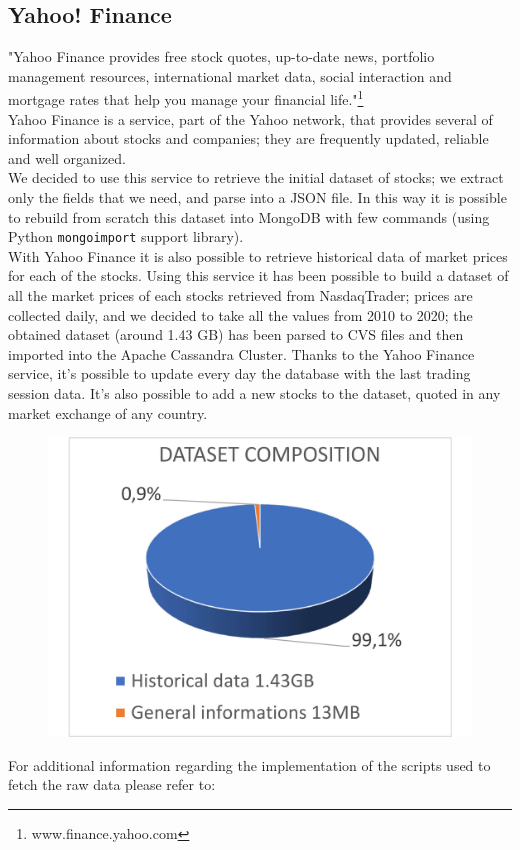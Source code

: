 \subsection{Yahoo! Finance}
"Yahoo Finance provides free stock quotes, up-to-date news, portfolio management
resources, international market data, social interaction and mortgage rates that
help you manage your financial life."\footnote{www.finance.yahoo.com}\\
Yahoo Finance is a service, part of the Yahoo network, that provides several of
information about stocks and companies; they are frequently updated, reliable
and well organized.\\
We decided to use this service to retrieve the initial dataset of stocks; we
extract only the fields that we need, and parse into a JSON file. In this way it
is possible to rebuild from scratch this dataset into MongoDB with few commands
(using Python \texttt{mongoimport} support library).\\
With Yahoo Finance it is also possible to retrieve historical data of market
prices for each of the stocks. Using this service it has been possible to build
a dataset of all the market prices of each stocks retrieved from NasdaqTrader;
prices are collected daily, and we decided to take all the values from 2010 to
2020; the obtained dataset (around 1.43 GB) has been parsed to CVS files and then
imported into the Apache Cassandra Cluster. Thanks to the Yahoo Finance service,
it's possible to update every day the database with the last trading session
data. It's also possible to add a new stocks to the dataset, quoted in any
market exchange of any country.
\begin{figure}[H]
	\begin{center}
		\includegraphics[scale=0.09]{img/dataset_comp.png}
	\end{center}
	\vspace{-0.6cm}
\end{figure}
\noindent
For additional information regarding the implementation of the scripts used to
fetch the raw data please refer to:
\vspace{0.2cm}
